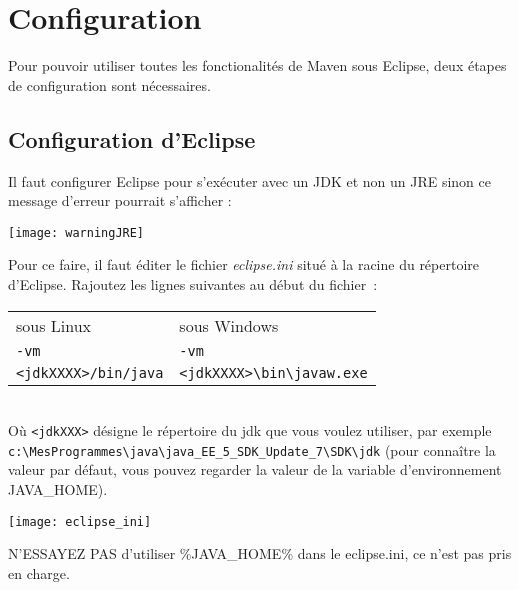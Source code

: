 % 

\section{Configuration}
Pour pouvoir utiliser toutes les fonctionalités de Maven sous Eclipse, deux étapes de configuration sont nécessaires.

\subsection{Configuration d'Eclipse}
Il faut configurer Eclipse pour s'exécuter avec un JDK et non un JRE sinon ce message d'erreur pourrait s'afficher : 

\begin{center}
\texttt{[image: warningJRE]}
\end{center}

\noindent
Pour ce faire, il faut éditer le fichier \emph{eclipse.ini} situé à la racine du répertoire d'Eclipse. Rajoutez les lignes suivantes au début du fichier~:\\

\smallskip 

\begin{tabular}[!t]{l|l}
sous Linux&sous Windows\\
\verb|-vm|&\verb|-vm|\\
\verb|<jdkXXXX>/bin/java|&\verb|<jdkXXXX>\bin\javaw.exe|\\
\end{tabular}\\

\medskip 
\noindent
Où \verb|<jdkXXX>| désigne le répertoire du jdk que vous voulez utiliser, par exemple \\
\verb|c:\MesProgrammes\java\java_EE_5_SDK_Update_7\SDK\jdk|
(pour conna\^itre la valeur par défaut, vous pouvez regarder la valeur de la variable d'environnement JAVA\_HOME).

\medskip 
\begin{center}
\texttt{[image: eclipse\_ini]}
\end{center}

\medskip 
\noindent
N'ESSAYEZ PAS d'utiliser \%JAVA\_HOME\% dans le eclipse.ini, ce n'est pas pris en charge.



